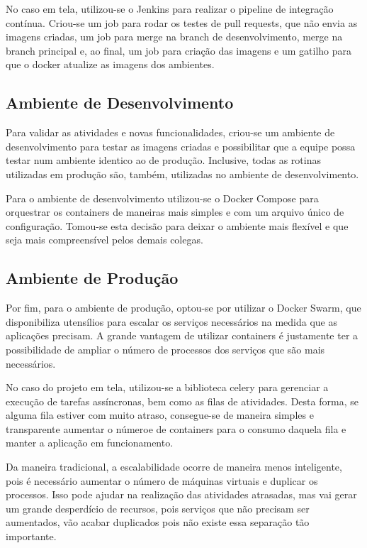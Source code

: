 \documentclass[
	12pt,				%
	openright,			%
	oneside,			%
	a4paper,			%
	chapter=TITLE,		%
	section=TITLE,		%
	english,			%
	french,				%
	spanish,			%
	brazil				%
	]{abntex2}
\begin{document}
No caso em tela, utilizou-se o Jenkins para realizar o pipeline de integração contínua. Criou-se um job para rodar os testes de pull requests, que não envia as imagens criadas, um job para merge na branch de desenvolvimento, merge na branch principal e, ao final, um job para criação das imagens e um gatilho para que o docker atualize as imagens dos ambientes.

\subsection{Ambiente de Desenvolvimento}

Para validar as atividades e novas funcionalidades, criou-se um ambiente de desenvolvimento para testar as imagens criadas e possibilitar que a equipe possa testar num ambiente identico ao de produção. Inclusive, todas as rotinas utilizadas em produção são, também, utilizadas no ambiente de desenvolvimento.

Para o ambiente de desenvolvimento utilizou-se o Docker Compose para orquestrar os containers de maneiras mais simples e com um arquivo único de configuração. Tomou-se esta decisão para deixar o ambiente mais flexível e que seja mais compreensível pelos demais colegas.

\subsection{Ambiente de Produção}

Por fim, para o ambiente de produção, optou-se por utilizar o Docker Swarm, que disponibiliza utensílios para escalar os serviços necessários na medida que as aplicações precisam. A grande vantagem de utilizar containers é justamente ter a possibilidade de ampliar o número de processos dos serviços que são mais necessários.

No caso do projeto em tela, utilizou-se a biblioteca celery para gerenciar a execução de tarefas assíncronas, bem como as filas de atividades. Desta forma, se alguma fila estiver com muito atraso, consegue-se de maneira simples e transparente aumentar o númeroe de containers para o consumo daquela fila e manter a aplicação em funcionamento.

Da maneira tradicional, a escalabilidade ocorre de maneira menos inteligente, pois é necessário aumentar o número de máquinas virtuais e duplicar os processos. Isso pode ajudar na realização das atividades atrasadas, mas vai gerar um grande desperdício de recursos, pois serviços que não precisam ser aumentados, vão acabar duplicados pois não existe essa separação tão importante.
\end{document}
